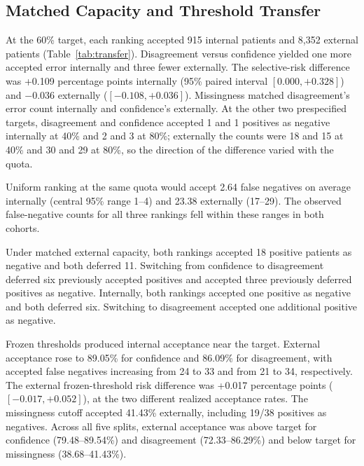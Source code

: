 \documentclass[conference]{IEEEtran}
\begin{document}
\subsection{Matched Capacity and Threshold Transfer}

At the 60\% target, each ranking accepted 915 internal patients and 8,352 external patients (Table~\ref{tab:transfer}). Disagreement versus confidence yielded one more accepted error internally and three fewer externally. The selective-risk difference was +0.109 percentage points internally (95\% paired interval $[0.000, +0.328]$) and $-$0.036 externally ($[-0.108, +0.036]$). Missingness matched disagreement's error count internally and confidence's externally. At the other two prespecified targets, disagreement and confidence accepted 1 and 1 positives as negative internally at 40\% and 2 and 3 at 80\%; externally the counts were 18 and 15 at 40\% and 30 and 29 at 80\%, so the direction of the difference varied with the quota.

Uniform ranking at the same quota would accept 2.64 false negatives on average internally (central 95\% range 1--4) and 23.38 externally (17--29). The observed false-negative counts for all three rankings fell within these ranges in both cohorts.

Under matched external capacity, both rankings accepted 18 positive patients as negative and both deferred 11. Switching from confidence to disagreement deferred six previously accepted positives and accepted three previously deferred positives as negative. Internally, both rankings accepted one positive as negative and both deferred six. Switching to disagreement accepted one additional positive as negative.

Frozen thresholds produced internal acceptance near the target. External acceptance rose to 89.05\% for confidence and 86.09\% for disagreement, with accepted false negatives increasing from 24 to 33 and from 21 to 34, respectively. The external frozen-threshold risk difference was +0.017 percentage points ($[-0.017, +0.052]$), at the two different realized acceptance rates. The missingness cutoff accepted 41.43\% externally, including 19/38 positives as negatives. Across all five splits, external acceptance was above target for confidence (79.48--89.54\%) and disagreement (72.33--86.29\%) and below target for missingness (38.68--41.43\%).
\end{document}
